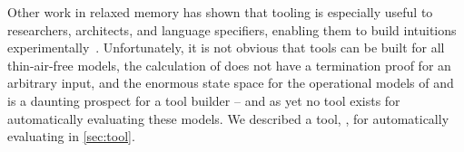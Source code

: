 Other work in relaxed memory has shown that tooling is especially useful to
researchers, architects, and language specifiers, enabling them to build
intuitions
experimentally~\cite{DBLP:conf/esop/PaviottiCPWOB20,PrideMM,alglave,Batty:2011:MCC:1926385.1926394}.
Unfortunately, it is not obvious that tools can be built for all
thin-air-free models, the calculation of
\citet{Pichon-Pharabod:2016:CSR:2837614.2837616} does not have a termination
proof for an arbitrary input, and the enormous state space for the
operational models of \citet{DBLP:conf/popl/KangHLVD17} and
\citet{DBLP:journals/pacmpl/ChakrabortyV19} is a daunting prospect for a tool
builder -- and as yet no tool exists for automatically evaluating these
models.  We described a tool, \PwTer, for automatically evaluating \PwT{} in
\textsection\ref{sec:tool}.
